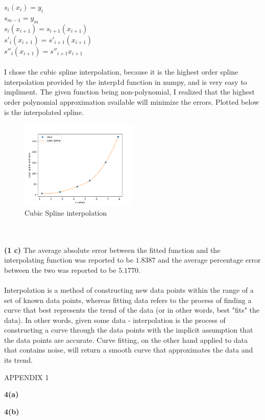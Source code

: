 \documentclass[12pt]{article}
\begin{document}
$s_i(x_i) = y_i$\\
$s_{m-1} = y_m$\\
$s_i(x_{i+1}) = s_{i+1}(x_{i+1})$\\
$s'_i(x_{i+1}) = s'_{i+1}(x_{i+1})$\\
$s''_i(x_{i+1}) = s''_{i+1}{x_{i+1}}$\\\\
I chose the cubic spline interpolation, because it is the highest order spline interpolation provided by the interp1d function in numpy, and is very easy to impliment. The given function being non-polynomial, I realized that the highest order polynomial approximation available will minimize the errors. Plotted below is the interpolated spline.
 \begin{figure}[h]
 	\centering
 	\includegraphics[width=0.50\textwidth]{cubic_spline.png}
 	\caption{Cubic Spline interpolation}
 \end{figure}\\\\ 
\textbf{(1 c)} The average absolute error between the fitted function and the interpolating function was reported to be $1.8387$ and the average percentage error between the two was reported to be $5.1770$.\\\\
Interpolation is a method of constructing new data points within the range of a set of known data points, whereas fitting data refers to the process of finding a curve that best represents the trend of the data (or in other words, best "fits" the data). In other words, given some data - interpolation is the process of constructing a curve through the data points with the implicit assumption that the data points are accurate. Curve fitting, on the other hand applied to data that contains noise, will return a smooth curve that approximates the data and its trend.
\newpage 
\begin{center}
APPENDIX 1 
\end{center}
\noindent \textbf{4(a)}


\newpage  
\noindent \textbf{4(b)}
\end{document}
